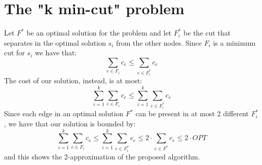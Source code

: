 \section{The "k min-cut" problem}
Let $F^*$ be an optimal solution for the problem and let $F^*_i$ be the cut that separates in the optimal solution $s_i$ from the other nodes. Since $F_i$ is a minimum cut for $s_i$ we have that: 
\[
\sum_{e \in F_i} c_e \leq \sum_{e \in F^*_i} c_e
\]
The cost of our solution, instead, is at most:
\[
\sum_{i=1}^{k} \sum_{e \in F_i} c_e \leq \sum_{i=1}^{k} \sum_{e \in F^*_i} c_e
\]
Since each edge in an optimal solution $F^*$ can be present in at most 2 different $F^*_i$, we have that our solution is bounded by:
\[
\sum_{i=1}^{k} \sum_{e \in F_i} c_e \leq \sum_{i=1}^{k} \sum_{e \in F^*_i} c_e \leq 2 \cdot \sum_{e \in F^*} c_e \leq 2 \cdot OPT
\]
and this shows the 2-approximation of the proposed algorithm.